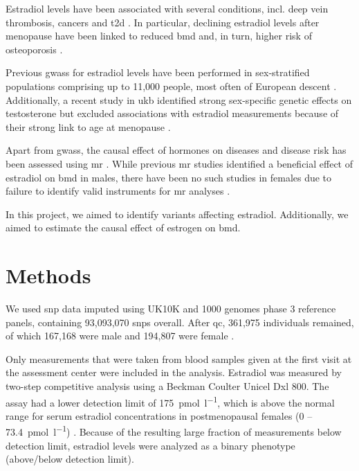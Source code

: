 \documentclass[twoside=false]{scrbook}
\begin{document}
Estradiol levels have been associated with several conditions, incl. deep vein thrombosis, cancers and \gls{t2d} \cite{Cauley1999a, Rosendaal2003b,Vikan2010}.
In particular, declining estradiol levels after menopause have been linked to reduced \gls{bmd} and, in turn, higher risk of osteoporosis \cite{Riggs1998a,Longo2012a}.

Previous \glspl{gwas} for estradiol levels have been performed in sex-stratified populations comprising up to 11,000 people, most often of European descent \cite{Pott2019e,Chen2013d,Liu2013b,Prescott2012f,Eriksson2018b}.
Additionally, a recent study in \gls{ukb} identified strong sex-specific genetic effects on testosterone but excluded associations with estradiol measurements because of their strong link to age at menopause \cite{Ruth2020d}.

Apart from \glspl{gwas}, the causal effect of hormones on diseases and disease risk has been assessed using \gls{mr} \cite{Eriksson2018b,Ruth2020d, Nethander2018a}.
While previous \gls{mr} studies identified a beneficial effect of estradiol on \gls{bmd} in males, there have been no such studies in females due to failure to identify valid instruments for \gls{mr} analyses \cite{Eriksson2018b, Nethander2018a}.

In this project, we aimed to identify variants affecting estradiol.
Additionally, we aimed to estimate the causal effect of estrogen on \gls{bmd}.

\section{Methods} \label{sec:p1methods}
We used \gls{snp} data imputed using UK10K and 1000 genomes phase 3 reference panels, containing 93,093,070 \glspl{snp} overall.
After \gls{qc}, 361,975 individuals remained, of which 167,168 were male and 194,807 were female \cite{Schmitz2021}.

Only measurements that were taken from blood samples given at the first visit at the assessment center were included in the analysis.
Estradiol was measured by two-step competitive analysis using a Beckman Coulter Unicel Dxl 800.
The assay had a lower detection limit of \qty{175}{\pmol\per\litre}, which is above the normal range for serum estradiol concentrations in postmenopausal females (0 -- \qty{73.4}{\pmol\per\litre}) \cite{Nakamoto2010a}.
Because of the resulting large fraction of measurements below detection limit, estradiol levels were analyzed as a binary phenotype (above/below detection limit).
\end{document}
